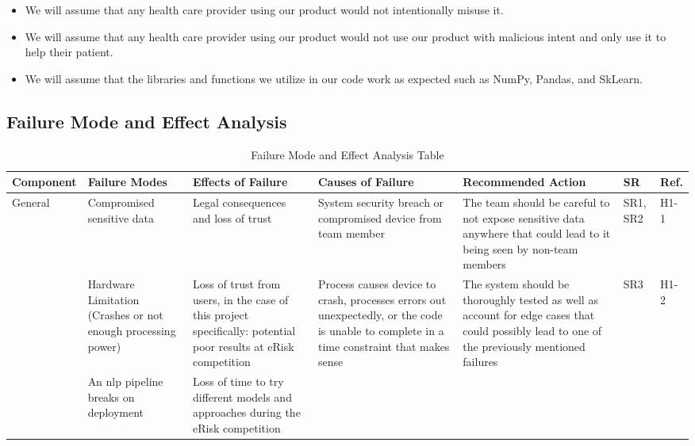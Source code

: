 \documentclass{article}
\begin{document}
\begin{itemize}
    \item We will assume that any health care provider using our product would not intentionally misuse it.
    \item We will assume that any health care provider using our product would not use our product with malicious intent and only use it to help their patient.
    \item We will assume that the libraries and functions we utilize in our code work as expected such as NumPy, Pandas, and SkLearn.
  \end{itemize}

\begin{landscape}
    \section{Failure Mode and Effect Analysis}
    \begin{longtable}{|p{}|p{}|p{}|p{}|p{}|p{}|p{}|}
        \caption{Failure Mode and Effect Analysis Table} \\
        \hline
        \textbf{Component} & \textbf{Failure Modes} & \textbf{Effects of Failure} & \textbf{Causes of Failure} & \textbf{Recommended Action} & \textbf{SR} & \textbf{Ref.} \\
        \hline
        \multirow{4}{*}{General} 
        & Compromised sensitive data
        & Legal consequences and loss of trust 
        & System security breach or compromised device from team member 
        & The team should be careful to not expose sensitive data anywhere that could lead to it being seen by non-team members 
        & SR1, SR2
        & H1-1 \\
        \cline{2-7}
        & Hardware Limitation (Crashes or not enough processing power)
        & Loss of trust from users, in the case of this project specifically: potential poor results at eRisk competition
        & Process causes device to crash, processes errors out unexpectedly, or the code is unable to complete in a time constraint that makes sense 
        & The system should be thoroughly tested as well as account for edge cases that could possibly lead to one of the previously mentioned failures  
        & SR3 
        & H1-2 \\
        \cline{2-7}
        & An nlp pipeline breaks on deployment
        & Loss of time to try different models and approaches during the eRisk competition

\end{longtable}
\end{landscape}
\end{document}
